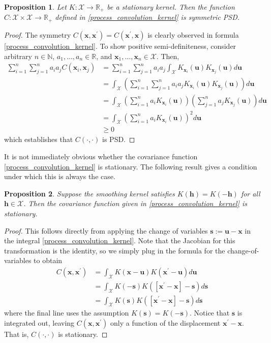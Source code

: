 \documentclass[12pt]{article}
\newcommand{\R}{\mathbb{R}}
\newcommand{\Ker}{K}
\newcommand{\covFun}{C}
\newcommand{\locSpace}{\mathcal{X}}
\newcommand{\loc}{\mathbf{x}}
\newcommand{\locTwo}{\loc^\prime}
\newcommand{\locDum}{\mathbf{u}}
\newcommand{\locLag}{\mathbf{h}}
\newcommand{\locLagDum}{\mathbf{s}}
\newtheorem{prop}{Proposition}
\begin{document}
\begin{prop} 
Let $\Ker: \locSpace \to \R_+$ be a stationary kernel. Then the function $\covFun: \locSpace \times \locSpace \to \R_+$ defined in \ref{process_convolution_kernel} is symmetric PSD. 
\end{prop}

\begin{proof} 
The symmetry $\covFun(\loc, \locTwo) = \covFun(\locTwo, \loc)$ is clearly observed in formula \ref{process_convolution_kernel}. To show positive semi-definiteness, consider arbitrary 
$n \in \mathbb{N}$, $a_1, \dots, a_n \in \R$, and $\loc_1, \dots, \loc_n \in \locSpace$. Then, 
\begin{align*}
\sum_{i = 1}^{n} \sum_{j = 1}^{n} a_i a_j \covFun(\loc_i, \loc_j) 
&= \sum_{i = 1}^{n} \sum_{j = 1}^{n} a_i a_j \int_{\locSpace} \Ker_{\loc_i}(\locDum) \Ker_{\loc_j}(\locDum) d\locDum \\
&= \int_{\locSpace} \left(\sum_{i = 1}^{n} \sum_{j = 1}^{n} a_i a_j  \Ker_{\loc_i}(\locDum) \Ker_{\loc_j}(\locDum)\right) d\locDum \\
&=  \int_{\locSpace} \left(\sum_{i = 1}^{n} a_i \Ker_{\loc_i}(\locDum)\right)  \left(\sum_{j = 1}^{n} a_j \Ker_{\loc_j}(\locDum)\right) d\locDum \\
&=  \int_{\locSpace} \left(\sum_{i = 1}^{n} a_i \Ker_{\loc_i}(\locDum)\right)^2 d\locDum \\
&\geq 0
\end{align*}
which establishes that $\covFun(\cdot, \cdot)$ is PSD. 
\end{proof} 

It is not immediately obvious whether the covariance function \ref{process_convolution_kernel} is stationary. The following result gives a condition under which this is always the case. 

\begin{prop} 
Suppose the smoothing kernel satisfies $\Ker(\locLag) = \Ker(-\locLag)$ for all $\locLag \in \locSpace$. Then the covariance function given in \ref{process_convolution_kernel} is stationary. 
\end{prop}

\begin{proof} 
This follows directly from applying the change of variables $\locLagDum := \locDum - \loc$ in the integral \ref{process_convolution_kernel}. Note that the Jacobian for this 
transformation is the identity, so we simply plug in the formula for the change-of-variables to obtain
\begin{align*}
\covFun(\loc, \locTwo) &= \int_{\locSpace} \Ker(\loc - \locDum)\Ker(\locTwo - \locDum) d\locDum \\ 
				  &=   \int_{\locSpace} \Ker(-\locLagDum)\Ker([\locTwo - \loc] - \locLagDum) d\locLagDum \\
				  &= \int_{\locSpace} \Ker(\locLagDum)\Ker([\locTwo - \loc] - \locLagDum) d\locLagDum
\end{align*}
where the final line uses the assumption $\Ker(\locLagDum) = \Ker(-\locLagDum)$. Notice that $\locLagDum$ is integrated out, leaving $\covFun(\loc, \locTwo)$ only a 
function of the displacement $\locTwo - \loc$. That is, $\covFun(\cdot, \cdot)$ is stationary. 
\end{proof}
\end{document}
